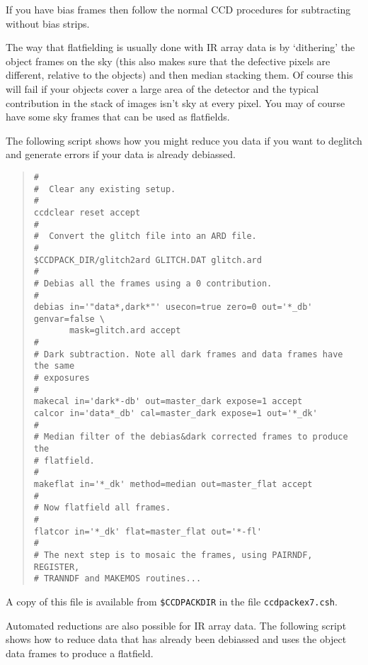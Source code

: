 \documentclass[twoside,11pt]{article}
\renewcommand{\_}{\texttt{\symbol{95}}}
\newenvironment{myquote}{\begin{quote}\begin{small}}{\end{small}\end{quote}}
\newcommand{\text}[1]{{\small \tt #1}}
\begin{document}
If you have bias frames then follow the normal CCD procedures for
subtracting without bias strips.

The way that flatfielding is usually done with IR array data is by
`dithering' the object frames on the sky (this also makes sure that the
defective pixels are different, relative to the objects) and then
median stacking them.
Of course this will fail if your objects cover a large area of the
detector and the typical contribution in the stack of images isn't sky
at every pixel.
You may of course have some sky frames that can be used as flatfields.

The following script shows how you might reduce you data if you want
to deglitch and generate errors if your data is already debiassed.

\begin{center}
\end{center}

\begin{myquote}
\begin{verbatim}
#
#  Clear any existing setup.
#
ccdclear reset accept
#
#  Convert the glitch file into an ARD file.
#
$CCDPACK_DIR/glitch2ard GLITCH.DAT glitch.ard
#
# Debias all the frames using a 0 contribution.
#
debias in='"data*,dark*"' usecon=true zero=0 out='*_db' genvar=false \
       mask=glitch.ard accept
#
# Dark subtraction. Note all dark frames and data frames have the same
# exposures
#
makecal in='dark*-db' out=master_dark expose=1 accept
calcor in='data*_db' cal=master_dark expose=1 out='*_dk'
#
# Median filter of the debias&dark corrected frames to produce the
# flatfield.
#
makeflat in='*_dk' method=median out=master_flat accept
#
# Now flatfield all frames.
#
flatcor in='*_dk' flat=master_flat out='*-fl'
#
# The next step is to mosaic the frames, using PAIRNDF, REGISTER,
# TRANNDF and MAKEMOS routines...
\end{verbatim}
\end{myquote}

A copy of this file is available from
\text{\$CCDPACK\_DIR} in the file \text{ccdpack\_ex7.csh}.

Automated reductions are also possible for IR array data. The
following script shows how to reduce data that has already been
debiassed and uses the object data frames to produce a flatfield.

\begin{center}
\end{center}
\end{document}
